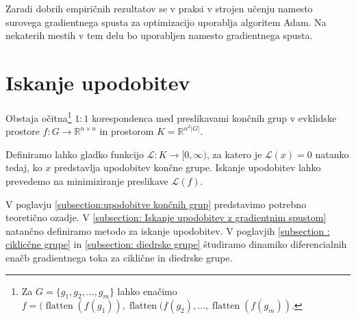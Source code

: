 \documentclass[mat2, tisk]{fmfdelo}
\newcommand{\R}{\mathbb R}
\newcommand{\loss }{\mathcal L}
\begin{document}
Zaradi dobrih empiričnih rezultatov se v praksi v strojen učenju
namesto surovega gradientnega spusta za optimizacijo uporablja
algoritem Adam. Na nekaterih mestih v tem delu bo uporabljen namesto
gradientnega spusta.
%
\section{Iskanje upodobitev}
Obstaja očitna\footnote{Za $G=\{g_1, g_2, \dotsc, g_m\}$ lahko
  enačimo $f = (\operatorname{flatten}(f(g_1)),
    \operatorname{flatten}(f(g_2), \dotsc,
    \operatorname{flatten}(f(g_{m}) )$.} $1:1$ korespondenca med
    preslikavami končnih grup v evklidske prostore  $f\colon G \to
    \R^{n \times n} $ in prostorom $K = \R^{n^2 |G|}$.

    Definiramo lahko gladko funkcijo $\loss \colon K \to [0,
    \infty)$, za katero je $\loss (x) = 0$ natanko tedaj, ko $x$
    predstavlja upodobitev končne grupe.
    Iskanje upodobitev lahko prevedemo na minimiziranje preslikave $\loss(f)$.

    V poglavju \ref{subsection:upodobitve končnih grup} predstavimo
    potrebno teoretično ozadje. V \ref{subsection: Iskanje upodobitev
    z gradientnim spustom} natančno definiramo metodo za iskanje
    upodobitev. V poglavjih
    \ref{subsection : ciklicčne grupe} in \ref{subsection: diedrske
    grupe} študiramo dinamiko diferencialnih enačb gradientnega toka
    za ciklične in diedrske grupe.
\end{document}
